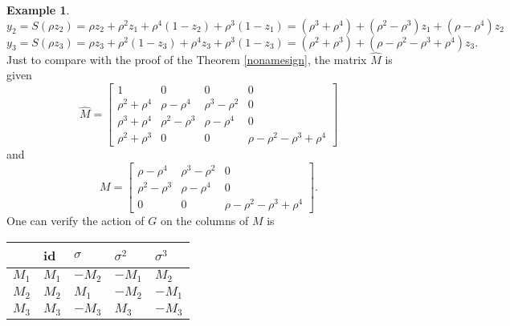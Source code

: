 \documentclass{article}
\theoremstyle{plain}
\theoremstyle{definition}
\newtheorem{example}[theorem]{Example}
\begin{document}
\begin{example}
$$y_2 = S(\rho z_2) = \rho z_2 + \rho^2 z_1 + \rho^4 (1-z_2) + \rho^3 (1-z_1)= (\rho^3 + \rho^4) + (\rho^2 -\rho^3)z_1+ (\rho-\rho^4)z_2$$
$$y_3 = S(\rho z_3) = \rho z_3 + \rho^2 (1-z_3) + \rho^4 z_3 + \rho^3 (1-z_3)= (\rho^2+\rho^3) + (\rho-\rho^2-\rho^3+\rho^4)z_3.$$
Just to compare with the proof of the Theorem \ref{nonamesign}, the matrix $\hat{M}$ is given 
$$
\hat{M} = \begin{bmatrix}
1 & 0&0&0\\
\rho^2+\rho^4 & \rho -\rho^4 & \rho^3 -\rho^2 & 0\\
\rho^3+\rho^4 & \rho^2 -\rho^3 & \rho -\rho^4 &0 \\
\rho^2+\rho^3 &0 &0 & \rho - \rho^2 -\rho^3+\rho^4
\end{bmatrix}
$$
 and 
 $$
 M = \begin{bmatrix}
 \rho -\rho^4 & \rho^3 -\rho^2 & 0\\
 \rho^2 -\rho^3 & \rho -\rho^4 &0 \\
0 &0 & \rho - \rho^2 -\rho^3+\rho^4
\end{bmatrix}.
$$
One can verify the action of $G$ on the columns of $M$ is 
\begin{table}[H]
\centering
\begin{tabular}{l|llll} 
 & id & $\sigma$ & $\sigma^2$ & $\sigma^3$\\
 \hline
 $M_1$  & $M_1$ & $-M_2$ & $-M_1$ & $M_2$ \\
$M_2$ & $M_2$ & $M_1$ & $-M_2$ & $-M_1$ \\
$M_3$ & $M_3$ & $-M_3$ & $M_3$ & $-M_3$ \\
\end{tabular}
\end{table}
\end{example}


{}
\end{document}
